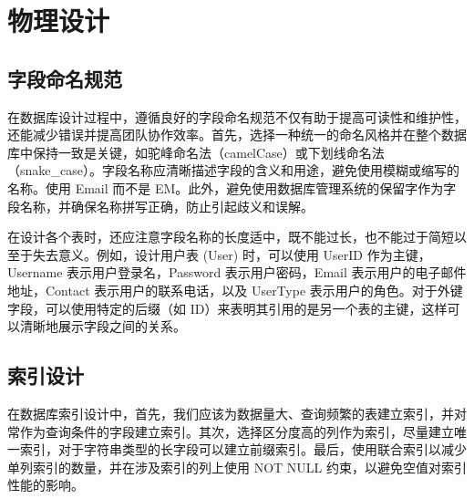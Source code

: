 \section{物理设计}

\subsection{字段命名规范}

在数据库设计过程中，遵循良好的字段命名规范不仅有助于提高可读性和维护性，还能减少错误并提高团队协作效率。首先，选择一种统一的命名风格并在整个数据库中保持一致是关键，如驼峰命名法（camelCase）或下划线命名法（snake\_case）。字段名称应清晰描述字段的含义和用途，避免使用模糊或缩写的名称。使用 Email 而不是 EM。此外，避免使用数据库管理系统的保留字作为字段名称，并确保名称拼写正确，防止引起歧义和误解。

在设计各个表时，还应注意字段名称的长度适中，既不能过长，也不能过于简短以至于失去意义。例如，设计用户表 (User) 时，可以使用 UserID 作为主键，Username 表示用户登录名，Password 表示用户密码，Email 表示用户的电子邮件地址，Contact 表示用户的联系电话，以及 UserType 表示用户的角色。对于外键字段，可以使用特定的后缀（如 ID）来表明其引用的是另一个表的主键，这样可以清晰地展示字段之间的关系。

\subsection{索引设计}

在数据库索引设计中，首先，我们应该为数据量大、查询频繁的表建立索引，并对常作为查询条件的字段建立索引。其次，选择区分度高的列作为索引，尽量建立唯一索引，对于字符串类型的长字段可以建立前缀索引。最后，使用联合索引以减少单列索引的数量，并在涉及索引的列上使用 NOT NULL 约束，以避免空值对索引性能的影响。

